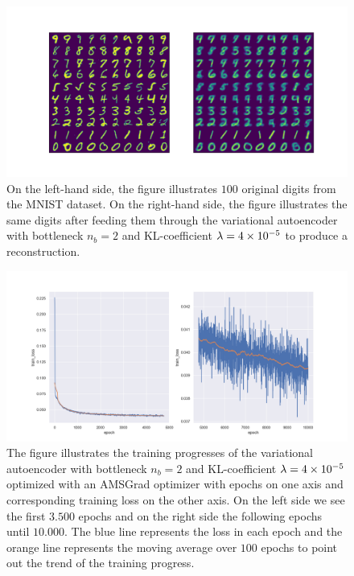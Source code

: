 \begin{figure}
\begin{center}
      \includegraphics[trim = 15mm 10mm 15mm 15mm, clip, width=\linewidth]{convolutional_VAE_snd_KL_4e-5_10k_epochs_2D_inference}
\end{center}
\caption{On the left-hand side, the figure illustrates $100$ original digits from the MNIST dataset. On the right-hand side, the figure illustrates the same digits after feeding them through the variational autoencoder with bottleneck $n_b=2$ and KL-coefficient $\lambda = \num{4e-5}$ to produce a reconstruction.}\label{fig:convolutional_VAE_snd_KL_4e-5_10k_epochs_2D_inference}
\end{figure}


\begin{figure}
\begin{center}
\includegraphics[width=\linewidth]{convolutional_VAE_snd_KL_4e-5_10k_epochs_2D_training_progress}
\end{center}
\caption{The figure illustrates the training progresses of the variational autoencoder with bottleneck $n_b=2$ and KL-coefficient $\lambda = \num{4e-5}$ optimized with an AMSGrad optimizer with epochs on one axis and corresponding training loss on the other axis. On the left side we see the first $3.500$ epochs and on the right side the following epochs until $10.000$. The blue line represents the loss in each epoch and the orange line represents the moving average over $100$ epochs to point out the trend of the training progress.}\label{fig:convolutional_VAE_snd_KL_4e-5_10k_epochs_2D_training_progress}
\end{figure}


